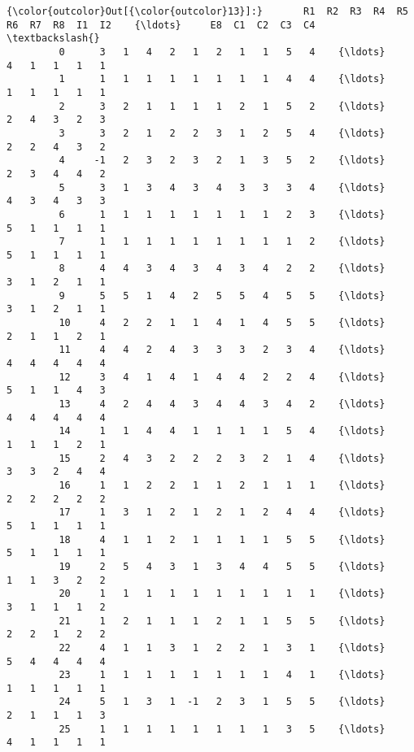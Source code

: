 \documentclass[11pt]{article}
\begin{document}
            \begin{Verbatim}[commandchars=\\\{\}]
{\color{outcolor}Out[{\color{outcolor}13}]:}       R1  R2  R3  R4  R5  R6  R7  R8  I1  I2    {\ldots}     E8  C1  C2  C3  C4  \textbackslash{}
         0      3   1   4   2   1   2   1   1   5   4    {\ldots}      4   1   1   1   1   
         1      1   1   1   1   1   1   1   1   4   4    {\ldots}      1   1   1   1   1   
         2      3   2   1   1   1   1   2   1   5   2    {\ldots}      2   4   3   2   3   
         3      3   2   1   2   2   3   1   2   5   4    {\ldots}      2   2   4   3   2   
         4     -1   2   3   2   3   2   1   3   5   2    {\ldots}      2   3   4   4   2   
         5      3   1   3   4   3   4   3   3   3   4    {\ldots}      4   3   4   3   3   
         6      1   1   1   1   1   1   1   1   2   3    {\ldots}      5   1   1   1   1   
         7      1   1   1   1   1   1   1   1   1   2    {\ldots}      5   1   1   1   1   
         8      4   4   3   4   3   4   3   4   2   2    {\ldots}      3   1   2   1   1   
         9      5   5   1   4   2   5   5   4   5   5    {\ldots}      3   1   2   1   1   
         10     4   2   2   1   1   4   1   4   5   5    {\ldots}      2   1   1   2   1   
         11     4   4   2   4   3   3   3   2   3   4    {\ldots}      4   4   4   4   4   
         12     3   4   1   4   1   4   4   2   2   4    {\ldots}      5   1   1   4   3   
         13     4   2   4   4   3   4   4   3   4   2    {\ldots}      4   4   4   4   4   
         14     1   1   4   4   1   1   1   1   5   4    {\ldots}      1   1   1   2   1   
         15     2   4   3   2   2   2   3   2   1   4    {\ldots}      3   3   2   4   4   
         16     1   1   2   2   1   1   2   1   1   1    {\ldots}      2   2   2   2   2   
         17     1   3   1   2   1   2   1   2   4   4    {\ldots}      5   1   1   1   1   
         18     4   1   1   2   1   1   1   1   5   5    {\ldots}      5   1   1   1   1   
         19     2   5   4   3   1   3   4   4   5   5    {\ldots}      1   1   3   2   2   
         20     1   1   1   1   1   1   1   1   1   1    {\ldots}      3   1   1   1   2   
         21     1   2   1   1   1   2   1   1   5   5    {\ldots}      2   2   1   2   2   
         22     4   1   1   3   1   2   2   1   3   1    {\ldots}      5   4   4   4   4   
         23     1   1   1   1   1   1   1   1   4   1    {\ldots}      1   1   1   1   1   
         24     5   1   3   1  -1   2   3   1   5   5    {\ldots}      2   1   1   1   3   
         25     1   1   1   1   1   1   1   1   3   5    {\ldots}      4   1   1   1   1   

\end{Verbatim}
\end{document}
